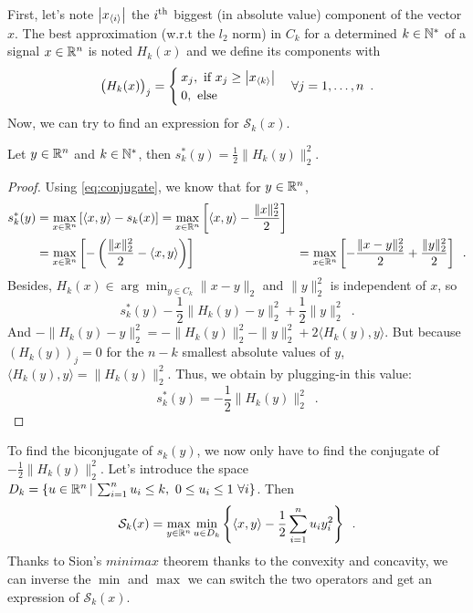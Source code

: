 First, let's note $\left|x_{\langle i\rangle}\right|$ the $i\textsuperscript{th}$ biggest (in absolute value) component of the vector $x$. The best approximation (w.r.t the $l_2$ norm) in $C_k$ for a determined $k\in\mathbb{N}^*$ of a signal $x\in\mathbb{R}^n$ is noted $H_k(x)$ and we define its components with 
\[\big(H_k(x)\big)_j = \begin{cases} x_j,\text{ if }x_j \geq \left|x_{\langle k\rangle}\right| \\
0, \text{ else }\end{cases} \forall j =1,\dots, n\enspace. \]
Now, we can try to find an expression for $\mathcal{S}_k(x)$.

\begin{proposition}\label{prop:skstar}
Let $y\in\mathbb{R}^n$ and $k\in\mathbb{N}^*$, then $s_k^*(y) = \frac{1}{2}\|H_k(y)\|^2_2$.
\end{proposition}

\begin{proof}
Using \eqref{eq:conjugate}, we know that for $y\in\mathbb{R}^n$,
\[
\begin{aligned}
s_k^*(y) & = \max_{x\in\mathbb{R}^n}\left[\langle x,y\rangle - s_k(x)\right] = \max_{x\in\mathbb{R}^n}\left[\langle x,y\rangle - \frac{\|x\|_2^2}{2}\right]\\
         & = \max_{x\in\mathbb{R}^n}\left[-\left(\frac{\|x\|^2_2}{2} - \langle x, y\rangle\right) \right]
         & = \max_{x\in\mathbb{R}^n}\left[-\frac{\|x-y\|^2_2}{2} + \frac{\|y\|^2_2}{2} \right] \enspace.
\end{aligned}
\]
Besides, $H_k(x)\in\arg\min_{y\in C_k}\|x-y\|_2$ and $\|y\|_2^2$ is independent of $x$, so 
\[s_k^*(y) -\frac{1}{2}\|H_k(y) - y\|^2_2 + \frac{1}{2}\|y\|_2^2\enspace.\]
And $-\|H_k(y) -y\|^2_2 = -\|H_k(y)\|_2^2 - \|y\|^2_2 + 2 \langle H_k(y),y\rangle$. But because $(H_k(y))_j=0$ for the $n-k$ smallest absolute values of $y$, $\langle H_k(y),y\rangle = \|H_k(y)\|_2^2$. Thus, we obtain by plugging-in this value:
\[s_k^*(y) = -\frac{1}{2}\|H_k(y)\|_2^2\enspace.\]
\end{proof}

To find the biconjugate of $s_k(y)$, we now only have to find the conjugate of $-\frac{1}{2}\|H_k(y)\|^2_2$. Let's introduce the space $D_k=\{u\in\mathbb{R}^n\,|\,\sum_{i=1}^n u_i \leq k,\  0\leq u_i\leq 1\ \forall i\}$. Then 
\begin{equation}\label{eq:minmax}
\mathcal{S}_k(x) = \max_{y\in\mathbb{R}^n}\min_{u\in D_k}\left\{\langle x, y\rangle - \frac{1}{2}\sum_{i=1}^n u_iy_i^2\right\}\enspace.
\end{equation}
Thanks to Sion's $minimax$ theorem \cite{10.2307/30037472} thanks to the convexity and concavity, we can inverse the $\min$ and $\max$ we can switch the two operators and get an expression of $\mathcal{S}_k(x)$.

